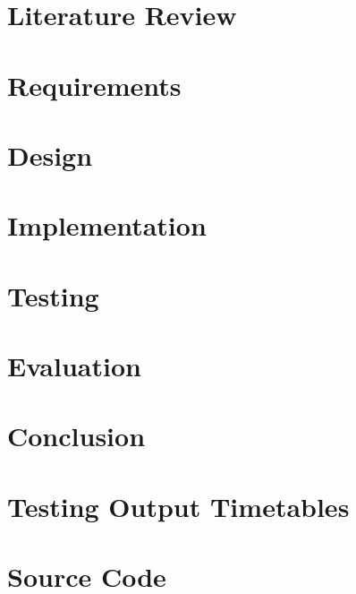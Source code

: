 \documentclass[a4paper, 12pt]{report}
\begin{document}
\chapter{Literature Review}


\chapter{Requirements}


\chapter{Design}


\chapter{Implementation}


\chapter{Testing}


\chapter{Evaluation}  %

\chapter{Conclusion}  %

\renewcommand\bibname{References}


\appendix

\listoffigures

\listoftables

\listoflistings

\chapter{Testing Output Timetables}  %

\chapter{Source Code}

\end{document}
